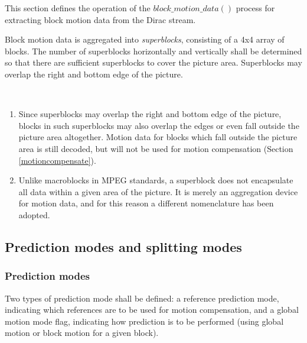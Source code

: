 
\label{motiondec}

This section defines the operation of the $block\_motion\_data()$ process for extracting
block motion data from the Dirac stream. 

Block motion data is aggregated into {\em superblocks}, consisting of a 4x4 array of 
blocks. The number of superblocks horizontally and vertically shall be determined so 
that there are sufficient superblocks to cover the picture area. Superblocks 
may overlap the right and bottom edge of the picture.

\begin{informative}
\\
\begin{enumerate}
\item Since superblocks may overlap the right and bottom edge of the picture, blocks in 
such superblocks may also overlap the edges or even fall outside the picture area
 altogether. Motion data for blocks which fall outside the picture area is still decoded, but
 will not be used for motion compensation (Section \ref{motioncompensate}). 

\item Unlike macroblocks in MPEG standards, a superblock does not encapsulate all 
data within a given area of the picture. It is merely an aggregation device for motion data,
and for this reason a different nomenclature has been adopted.
\end{enumerate}
\end{informative}

\subsection{Prediction modes and splitting modes}

\subsubsection{Prediction modes}

Two types of prediction mode shall be defined: a reference prediction mode, indicating
which references are to be used for motion compensation,  and a global motion
 mode flag, indicating how prediction is to be performed (using global motion or block
 motion for a given block).

